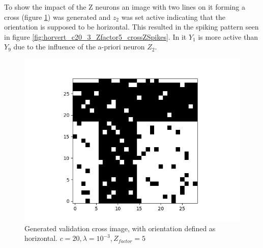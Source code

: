 To show the impact of the Z neurons an image with two lines on it forming a cross (figure \ref{fig:horvertValidationCross}) was generated and $z_2$ was set active indicating that the orientation is supposed to be horizontal. This resulted in the spiking pattern seen in figure \ref{fig:horvert_c20_3_Zfactor5_crossZSpikes}. In it $Y_1$ is more active than $Y_9$ due to the influence of the a-priori neuron $Z_2$.

\begin{figure}
  \includegraphics[width=\linewidth]{figures/horvert/horvert_c20_3_Zfactor5_validationCross.png}
  \caption{Generated validation cross image, with orientation defined as horizontal. $c = 20, \lambda = 10^{-3}, Z_{factor} = 5$}
  \label{fig:horvertValidationCross}
\end{figure}

